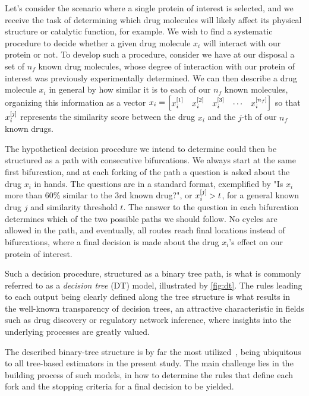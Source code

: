 Let's consider the scenario where a single protein of interest is selected, and we receive the task of determining which drug molecules will likely affect its physical structure or catalytic function, for example. We wish to find a systematic procedure to decide whether a given drug molecule $x_i$ will interact with our protein or not. To develop such a procedure, consider we have at our disposal a set of $n_f$ known drug molecules, whose degree of interaction with our protein of interest was previously experimentally determined. We can then describe a drug molecule $x_i$ in general by how similar it is to each of our $n_f$ known molecules, organizing this information as a vector $x_i = \begin{bmatrix}x_i^{[1]} & x_i^{[2]} & x_i^{[3]} & \cdots & x_i^{[n_f]}\end{bmatrix}$ so that $x_i^{[j]}$ represents the similarity score between the drug $x_i$ and the $j$-th of our $n_f$ known drugs.

The hypothetical decision procedure we intend to determine could then be structured as a path with consecutive bifurcations. We always start at the same first bifurcation, and at each forking of the path a question is asked about the drug $x_i$ in hands. The questions are in a standard format, exemplified by "Is $x_i$ more than 60\% similar to the 3rd known drug?", or $x_i^{[j]} > t$, for a general known drug $j$ and similarity threshold $t$. The answer to the question in each bifurcation determines which of the two possible paths we should follow. No cycles are allowed in the path, and eventually, all routes reach final locations instead of bifurcations, where a final decision is made about the drug $x_i$'s effect on our protein of interest.

Such a decision procedure, structured as a binary tree path, is what is commonly referred to as a \emph{decision tree} (DT) model, illustrated by \autoref{fig:dt}. The rules leading to each output being clearly defined along the tree structure is what results in the well-known transparency of decision trees, an attractive characteristic in fields such as drug discovery or regulatory network inference, where insights into the underlying processes are greatly valued.

The described binary-tree structure is by far the most utilized~\cite{}, being ubiquitous to all tree-based estimators in the present study. The main challenge lies in the building process of such models, in how to determine the rules that define each fork and the stopping criteria for a final decision to be yielded.

